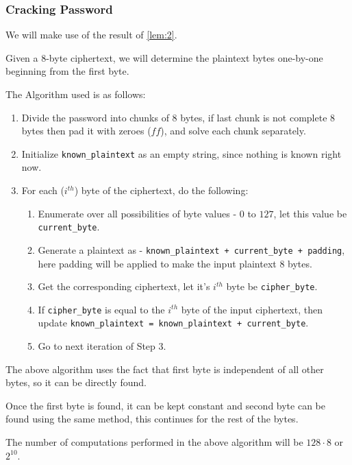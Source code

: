 \documentclass[10pt,twoside]{article}
\begin{document}
\subsubsection{Cracking Password}
We will make use of the result of \cref{lem:2}. \newline

Given a 8-byte ciphertext, we will determine the plaintext bytes one-by-one beginning from the first byte. \newline

The Algorithm used is as follows:
\begin{enumerate}
  \setlength\itemsep{0em}
  \item Divide the password into chunks of 8 bytes, if last chunk is not complete 8 bytes then pad it with zeroes ($ff$), and solve each chunk separately.
  \item Initialize \texttt{known\_plaintext} as an empty string, since nothing is known right now.
  \item For each ($i^{th}$) byte of the ciphertext, do the following:
    \begin{enumerate}
      \setlength\itemsep{0em}
      \item Enumerate over all possibilities of byte values - $0$ to $127$, let this value be \texttt{current\_byte}.
      \item Generate a plaintext as - \texttt{known\_plaintext + current\_byte + padding}, here padding will be applied to make the input plaintext 8 bytes.
      \item Get the corresponding ciphertext, let it's $i^{th}$ byte be \texttt{cipher\_byte}.
      \item If \texttt{cipher\_byte} is equal to the $i^{th}$ byte of the input ciphertext, then update \texttt{known\_plaintext = known\_plaintext + current\_byte}.
      \item Go to next iteration of Step 3.
    \end{enumerate}
\end{enumerate}

The above algorithm uses the fact that first byte is independent of all other bytes, so it can be directly found. \newline

Once the first byte is found, it can be kept constant and second byte can be found using the same method, this continues for the rest of the bytes. \newline

The number of computations performed in the above algorithm will be $128\cdot 8$ or $2^{10}$. \newline
\end{document}
